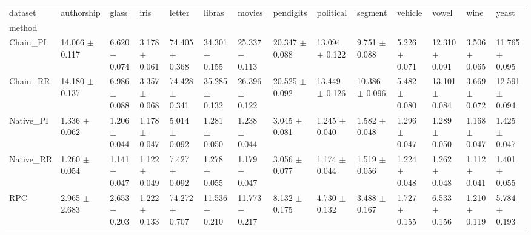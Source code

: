 \begin{tabular}{llllllllllllll}
\toprule
dataset &            authorship &                glass &                 iris &                letter &                libras &                movies &             pendigits &             political &               segment &              vehicle &                 vowel &                 wine &                 yeast \\
method    &                       &                      &                      &                       &                       &                       &                       &                       &                       &                      &                       &                      &                       \\
\midrule
Chain_PI  &  14.066 $ \pm $ 0.117 &  6.620 $ \pm $ 0.074 &  3.178 $ \pm $ 0.061 &  74.405 $ \pm $ 0.368 &  34.301 $ \pm $ 0.155 &  25.337 $ \pm $ 0.113 &  20.347 $ \pm $ 0.088 &  13.094 $ \pm $ 0.122 &   9.751 $ \pm $ 0.088 &  5.226 $ \pm $ 0.071 &  12.310 $ \pm $ 0.091 &  3.506 $ \pm $ 0.065 &  11.765 $ \pm $ 0.095 \\
Chain_RR  &  14.180 $ \pm $ 0.137 &  6.986 $ \pm $ 0.088 &  3.357 $ \pm $ 0.068 &  74.428 $ \pm $ 0.341 &  35.285 $ \pm $ 0.132 &  26.396 $ \pm $ 0.122 &  20.525 $ \pm $ 0.092 &  13.449 $ \pm $ 0.126 &  10.386 $ \pm $ 0.096 &  5.482 $ \pm $ 0.080 &  13.101 $ \pm $ 0.084 &  3.669 $ \pm $ 0.072 &  12.591 $ \pm $ 0.094 \\
Native_PI &   1.336 $ \pm $ 0.062 &  1.206 $ \pm $ 0.044 &  1.178 $ \pm $ 0.047 &   5.014 $ \pm $ 0.092 &   1.281 $ \pm $ 0.050 &   1.238 $ \pm $ 0.044 &   3.045 $ \pm $ 0.081 &   1.245 $ \pm $ 0.040 &   1.582 $ \pm $ 0.048 &  1.296 $ \pm $ 0.047 &   1.289 $ \pm $ 0.050 &  1.168 $ \pm $ 0.047 &   1.425 $ \pm $ 0.047 \\
Native_RR &   1.260 $ \pm $ 0.054 &  1.141 $ \pm $ 0.047 &  1.122 $ \pm $ 0.049 &   7.427 $ \pm $ 0.092 &   1.278 $ \pm $ 0.055 &   1.179 $ \pm $ 0.047 &   3.056 $ \pm $ 0.077 &   1.174 $ \pm $ 0.044 &   1.519 $ \pm $ 0.056 &  1.224 $ \pm $ 0.048 &   1.262 $ \pm $ 0.048 &  1.112 $ \pm $ 0.041 &   1.401 $ \pm $ 0.055 \\
RPC       &   2.965 $ \pm $ 2.683 &  2.653 $ \pm $ 0.203 &  1.222 $ \pm $ 0.133 &  74.272 $ \pm $ 0.707 &  11.536 $ \pm $ 0.210 &  11.773 $ \pm $ 0.217 &   8.132 $ \pm $ 0.175 &   4.730 $ \pm $ 0.132 &   3.488 $ \pm $ 0.167 &  1.727 $ \pm $ 0.155 &   6.533 $ \pm $ 0.156 &  1.210 $ \pm $ 0.119 &   5.784 $ \pm $ 0.193 \\

\end{tabular}
